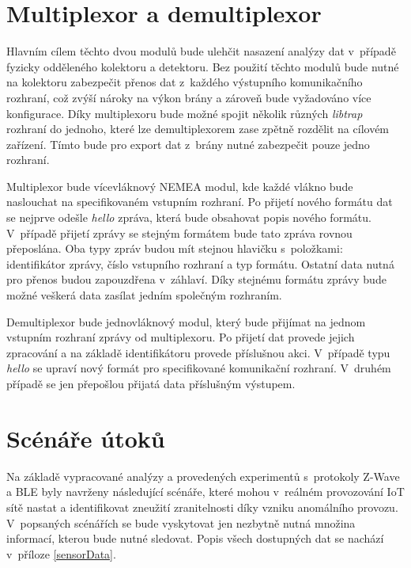 \section{Multiplexor a demultiplexor}
 Hlavním cílem těchto dvou modulů bude ulehčit nasazení analýzy dat v~případě fyzicky odděleného
 kolektoru a detektoru. Bez použití těchto modulů bude nutné na kolektoru zabezpečit přenos dat
 z~každého výstupního komunikačního rozhraní, což zvýší nároky na výkon brány a zároveň bude vyžadováno
 více konfigurace. Díky multiplexoru bude možné spojit několik různých \textit{libtrap} 
 rozhraní do jednoho, které lze demultiplexorem zase zpětně rozdělit na cílovém zařízení.
 Tímto bude pro export dat z~brány nutné zabezpečit pouze jedno rozhraní.

 Multiplexor bude vícevláknový NEMEA modul, kde každé vlákno bude naslouchat na specifikovaném
 vstupním rozhraní. Po přijetí nového formátu dat se nejprve odešle \textit{hello} zpráva, která
 bude obsahovat popis nového formátu. V~případě přijetí zprávy se stejným formátem bude tato 
 zpráva rovnou přeposlána. Oba typy zpráv budou mít stejnou hlavičku s~položkami: 
 identifikátor zprávy, 
 číslo vstupního rozhraní a typ formátu. Ostatní data nutná pro přenos budou zapouzdřena
v~záhlaví. Díky stejnému formátu zprávy bude možné veškerá data zasílat jedním společným rozhraním.
 
 Demultiplexor bude jednovláknový modul, který bude přijímat na jednom vstupním rozhraní zprávy
 od multiplexoru. Po přijetí dat provede jejich zpracování a na základě identifikátoru 
 provede příslušnou akci. V~případě typu \textit{hello} se upraví nový formát pro specifikované 
 komunikační rozhraní. V~druhém případě se jen přepošlou přijatá data příslušným výstupem.
 
 \newpage
 \section{Scénáře útoků} \label{utoky}
 Na základě vypracované analýzy a provedených experimentů s~protokoly Z-Wave a BLE byly navrženy
 následující scénáře, které mohou v~reálném provozování IoT sítě nastat a identifikovat zneužití
 zranitelnosti díky vzniku anomálního provozu. V~popsaných scénářích se bude vyskytovat jen nezbytně
 nutná množina informací, kterou bude nutné sledovat. Popis všech dostupných dat se nachází
 v~příloze \ref{sensorData}.
 
